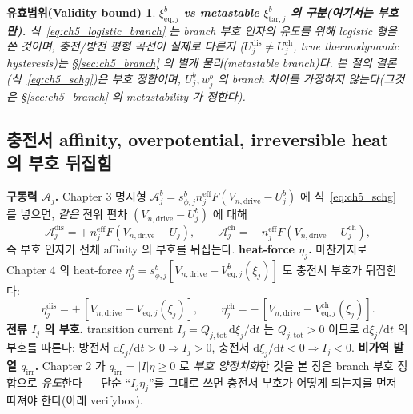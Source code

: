 \documentclass[11pt,a4paper]{article}
\newtheorem*{boundbox}{유효범위(Validity bound)}
\newcommand{\dd}{\mathrm{d}}
\newcommand{\eff}{\mathrm{eff}}
\newcommand{\eq}{\mathrm{eq}}
\newcommand{\drive}{\mathrm{drive}}
\newcommand{\tot}{\mathrm{tot}}
\newcommand{\irr}{\mathrm{irr}}
\newcommand{\dis}{\mathrm{dis}}
\newcommand{\chg}{\mathrm{ch}}
\newcommand{\tar}{\mathrm{tar}}
\begin{document}
\begin{boundbox}
\textbf{$\xi_{\eq,j}^b$ vs metastable $\xi_{\tar,j}^b$ 의 구분(여기서는 부호만).} 식~\eqref{eq:ch5_logistic_branch}
는 \emph{branch 부호 인자의 유도}를 위해 logistic 형을 쓴 것이며, 충전/방전 평형 곡선이 \emph{실제로 다른지}
($U_j^\dis\ne U_j^\chg$, true thermodynamic hysteresis)는 \S\ref{sec:ch5_branch} 의 별개 물리(metastable
branch)다. 본 절의 결론(식~\eqref{eq:ch5_schg})은 \emph{부호 정합}이며, $U_j^b,w_j^b$ 의 branch 차이를
가정하지 않는다(그것은 \S\ref{sec:ch5_branch} 의 metastability 가 정한다).
\end{boundbox}

\subsection{충전서 affinity, overpotential, irreversible heat 의 부호 뒤집힘}\label{sec:ch5_sign_flip}
\textbf{구동력 $\mathcal A_j$.} Chapter 3 명시형 $\mathcal A_j^b=s_{\phi,j}^b n_j^{\eff}F(V_{n,\drive}-U_j^b)$
에 식~\eqref{eq:ch5_schg} 를 넣으면, \emph{같은} 전위 편차 $(V_{n,\drive}-U_j^b)$ 에 대해
\begin{equation}
\mathcal A_j^\dis=+\,n_j^{\eff}F(V_{n,\drive}-U_j),\qquad
\mathcal A_j^\chg=-\,n_j^{\eff}F(V_{n,\drive}-U_j^\chg),
\label{eq:ch5_A_branch}
\end{equation}
즉 부호 인자가 전체 affinity 의 부호를 뒤집는다. \textbf{heat-force $\eta_j$.} 마찬가지로 Chapter 4 의
heat-force $\eta_j^b=s_{\phi,j}^b[V_{n,\drive}-V_{\eq,j}^b(\xi_j)]$ 도 충전서 부호가 뒤집힌다:
\begin{equation}
\eta_j^\dis=+\,[V_{n,\drive}-V_{\eq,j}(\xi_j)],\qquad
\eta_j^\chg=-\,[V_{n,\drive}-V_{\eq,j}^\chg(\xi_j)].
\label{eq:ch5_eta_branch}
\end{equation}
\textbf{전류 $I_j$ 의 부호.} transition current $I_j=Q_{j,\tot}\,\dd\xi_j/\dd t$ 는 $Q_{j,\tot}>0$ 이므로
$\dd\xi_j/\dd t$ 의 부호를 따른다: 방전서 $\dd\xi_j/\dd t>0\Rightarrow I_j>0$, 충전서 $\dd\xi_j/\dd t<0\Rightarrow
I_j<0$. \textbf{비가역 발열 $q_\irr$.} Chapter 2 가 $q_\irr=|I|\eta\ge0$ 로 \emph{부호 양정치화}한 것을 본 장은
branch 부호 정합으로 \emph{유도}한다 — 단순 ``$I_j\eta_j$''를 그대로 쓰면 충전서 부호가 어떻게 되는지를 먼저
따져야 한다(아래 verifybox).
\end{document}
